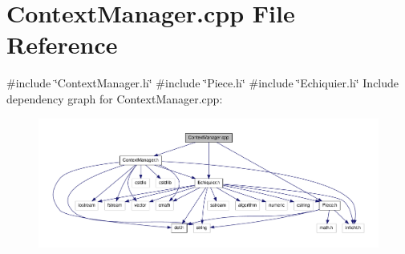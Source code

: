 \section{\-Context\-Manager.\-cpp \-File \-Reference}
\label{_context_manager_8cpp}
{\ttfamily \#include \char`\"{}\-Context\-Manager.\-h\char`\"{}}\*
{\ttfamily \#include \char`\"{}\-Piece.\-h\char`\"{}}\*
{\ttfamily \#include \char`\"{}\-Echiquier.\-h\char`\"{}}\*
\-Include dependency graph for \-Context\-Manager.\-cpp\-:
\nopagebreak
\begin{figure}[H]
\begin{center}
\leavevmode
\includegraphics[width=350pt]{_context_manager_8cpp__incl}
\end{center}
\end{figure}
